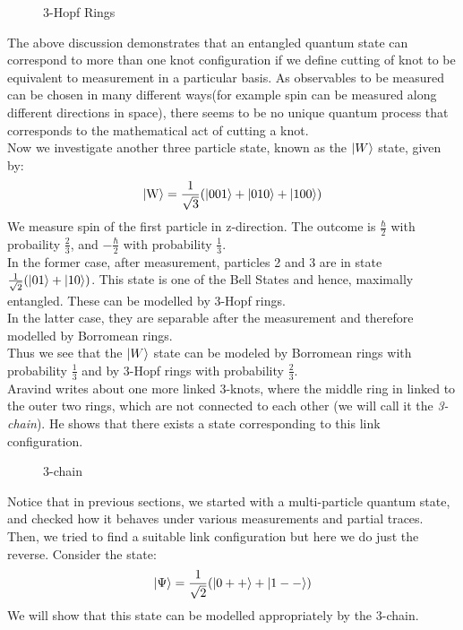 \documentclass{scrartcl}
\begin{document}
\begin{figure}[H]
    \centering
   \scalebox{0.8}{ }
   \caption{3-Hopf Rings}
\end{figure}
\noindent
The above discussion demonstrates that an entangled quantum state can correspond to more than one knot configuration if we define cutting of knot to be equivalent to measurement in a particular basis. As observables to be measured can be chosen in many different ways(for example spin can be measured along different directions in space), there seems to be no unique quantum process that corresponds to the mathematical act of cutting a knot. \\[0.3cm]
Now we investigate another three particle state, known as the $\ket{W}$ state, given by:
\[
\ket{\mathrm{W}} = \frac{1}{\sqrt{3}} (\ket{001}+\ket{010}+\ket{100}) 
\]
We measure spin of the first particle in z-direction. The outcome is $\frac{\hbar}{2}$ with probaility $\frac{2}{3}$, and $-\frac{\hbar}{2}$ with probability $\frac{1}{3}$.\\[0.2cm]
In the former case, after measurement, particles 2 and 3 are in state $\frac{1}{\sqrt{2}}(\ket{01}+\ket{10})$. This state is one of the Bell States and hence, maximally entangled. These can be modelled by 3-Hopf rings.\\[0.3cm] In the latter case, they are separable after the measurement and therefore modelled by Borromean rings.\\[0.3cm]
Thus we see that the $\ket{W}$ state can be modeled by Borromean rings with probability $\frac{1}{3}$ and by 3-Hopf rings with probability $\frac{2}{3}$.\\[0.3cm]
Aravind writes about one more linked 3-knots, where the middle ring in linked to the outer two rings, which are not connected to each other (we will call it the \textit{3-chain}). He shows that there exists a state corresponding to this link configuration.
\begin{figure}[H]
    \centering
   \scalebox{0.8}{ }
   \caption{3-chain}
\end{figure}
\noindent
Notice that in previous sections, we started with a multi-particle quantum state, and checked how it behaves under various measurements and partial traces. Then, we tried to find a suitable link configuration but here we do just the reverse. 
Consider the state:
\[
\ket{\Psi} = \frac{1}{\sqrt{2}} (\ket{0++}+\ket{1--})
\]
We will show that this state can be modelled appropriately by the 3-chain.
\end{document}
